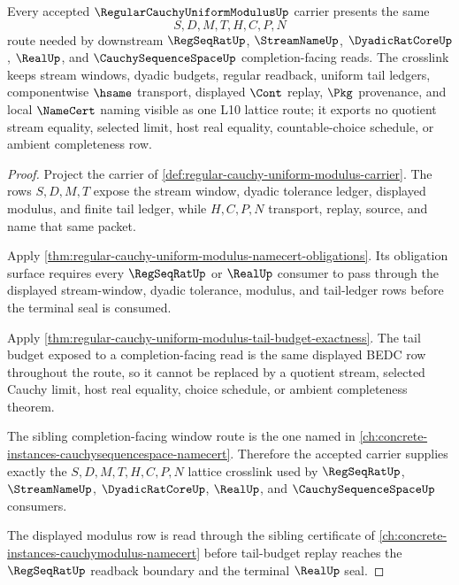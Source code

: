 \begin{theorem}
\label{thm:regular-cauchy-uniform-modulus-lattice-crosslink}
Every accepted $\RegularCauchyUniformModulusUp$ carrier presents the same
$$
S,D,M,T,H,C,P,N
$$
route needed by downstream $\RegSeqRatUp$, $\StreamNameUp$, $\DyadicRatCoreUp$, $\RealUp$, and $\CauchySequenceSpaceUp$ completion-facing reads. The crosslink keeps stream windows, dyadic budgets, regular readback, uniform tail ledgers, componentwise $\hsame$ transport, displayed $\Cont$ replay, $\Pkg$ provenance, and local $\NameCert$ naming visible as one L10 lattice route; it exports no quotient stream equality, selected limit, host real equality, countable-choice schedule, or ambient completeness row.
\end{theorem}
\begin{proof}
Project the carrier of \autoref{def:regular-cauchy-uniform-modulus-carrier}. The rows $S,D,M,T$ expose the stream window, dyadic tolerance ledger, displayed modulus, and finite tail ledger, while $H,C,P,N$ transport, replay, source, and name that same packet.

Apply \autoref{thm:regular-cauchy-uniform-modulus-namecert-obligations}. Its obligation surface requires every $\RegSeqRatUp$ or $\RealUp$ consumer to pass through the displayed stream-window, dyadic tolerance, modulus, and tail-ledger rows before the terminal seal is consumed.

Apply \autoref{thm:regular-cauchy-uniform-modulus-tail-budget-exactness}. The tail budget exposed to a completion-facing read is the same displayed BEDC row throughout the route, so it cannot be replaced by a quotient stream, selected Cauchy limit, host real equality, choice schedule, or ambient completeness theorem.

The sibling completion-facing window route is the one named in \autoref{ch:concrete-instances-cauchysequencespace-namecert}. Therefore the accepted carrier supplies exactly the $S,D,M,T,H,C,P,N$ lattice crosslink used by $\RegSeqRatUp$, $\StreamNameUp$, $\DyadicRatCoreUp$, $\RealUp$, and $\CauchySequenceSpaceUp$ consumers.

The displayed modulus row is read through the sibling certificate of \autoref{ch:concrete-instances-cauchymodulus-namecert} before tail-budget replay reaches the $\RegSeqRatUp$ readback boundary and the terminal $\RealUp$ seal.
\end{proof}


